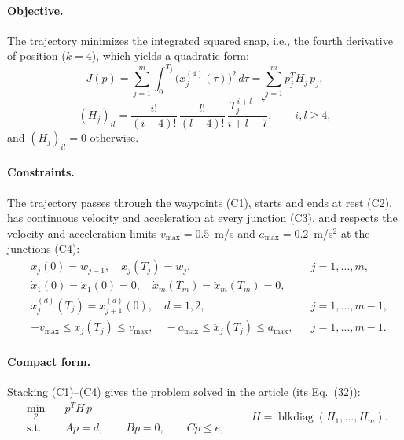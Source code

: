 \paragraph{Objective.}
The trajectory minimizes the integrated squared snap, i.e., the fourth derivative of position ($k=4$), which yields a quadratic form:
\begin{equation}
J(p) = \sum_{j=1}^{m}\int_{0}^{T_j}\big(x_j^{(4)}(\tau)\big)^2\,d\tau = \sum_{j=1}^{m} p_j^T H_j\, p_j ,
\label{eq:objective}
\end{equation}
\begin{equation}
(H_j)_{il} = \frac{i!}{(i-4)!}\,\frac{l!}{(l-4)!}\,\frac{T_j^{\,i+l-7}}{i+l-7}, \qquad i,l \ge 4,
\label{eq:H}
\end{equation}
and $(H_j)_{il}=0$ otherwise.

\paragraph{Constraints.}
The trajectory passes through the waypoints (C1), starts and ends at rest (C2), has continuous velocity and acceleration at every junction (C3), and respects the velocity and acceleration limits $v_{\max}=0.5$~m/s and $a_{\max}=0.2$~m/s$^2$ at the junctions (C4):
\begin{align}
& x_j(0) = w_{j-1}, \quad x_j(T_j) = w_j, && j=1,\dots,m, \tag{C1}\\
& \dot{x}_1(0)=\ddot{x}_1(0)=0, \quad \dot{x}_m(T_m)=\ddot{x}_m(T_m)=0, && \tag{C2}\\
& x_j^{(d)}(T_j) = x_{j+1}^{(d)}(0), \quad d=1,2, && j=1,\dots,m-1, \tag{C3}\\
& -v_{\max}\le \dot{x}_j(T_j)\le v_{\max}, \quad -a_{\max}\le \ddot{x}_j(T_j)\le a_{\max}, && j=1,\dots,m-1. \tag{C4}
\end{align}

\paragraph{Compact form.}
Stacking (C1)--(C4) gives the problem solved in the article (its Eq.~(32)):
\begin{equation}
\begin{aligned}
\min_{p}\quad & p^T H\, p\\
\text{s.t.}\quad & A p = d, \qquad B p = 0, \qquad C p \le e,
\end{aligned}
\qquad H = \operatorname{blkdiag}(H_1,\dots,H_m).
\label{eq:qp}
\end{equation}

